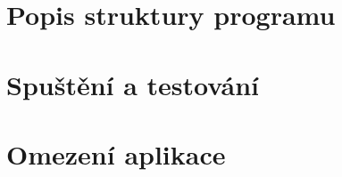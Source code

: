 
    \section{Popis struktury programu}
    


    \section{Spuštění a testování}

    \section{Omezení aplikace}
    

      

